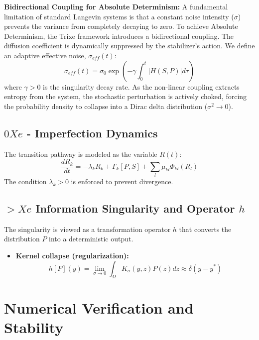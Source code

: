 \documentclass[12pt, a4paper]{article}
\begin{document}
\textbf{Bidirectional Coupling for Absolute Determinism:} 
A fundamental limitation of standard Langevin systems is that a constant noise intensity ($\sigma$) prevents the variance from completely decaying to zero. To achieve Absolute Determinism, the Trixe framework introduces a bidirectional coupling. The diffusion coefficient is dynamically suppressed by the stabilizer's action. We define an adaptive effective noise, $\sigma_{eff}(t)$:
\begin{equation}
\sigma_{eff}(t) = \sigma_0 \exp\left(-\gamma \int_0^t |H(S,P)| d\tau\right)
\end{equation}
where $\gamma > 0$ is the singularity decay rate. As the non-linear coupling extracts entropy from the system, the stochastic perturbation is actively choked, forcing the probability density to collapse into a Dirac delta distribution ($\sigma^2 \to 0$).

\subsection{$0Xe$ - Imperfection Dynamics}
The transition pathway is modeled as the variable $R(t)$:
\begin{equation}
\frac{dR_{k}}{dt}=-\lambda_{k}R_{k}+\Gamma_{k}[P,S]+\sum_{l}\mu_{kl}\Phi_{kl}(R_{l})
\end{equation}
The condition $\lambda_{k}>0$ is enforced to prevent divergence.

\subsection{$>Xe$ Information Singularity and Operator $h$}
The singularity is viewed as a transformation operator $h$ that converts the distribution $P$ into a deterministic output.
\begin{itemize}
    \item \textbf{Kernel collapse (regularization):} 
    \begin{equation}
    h[P](y)=\lim_{\sigma\rightarrow0}\int_{\Omega}K_{\sigma}(y,z)P(z)dz\approx\delta(y-y^{*})
    \end{equation}
\end{itemize}

\section{Numerical Verification and Stability}
\end{document}
